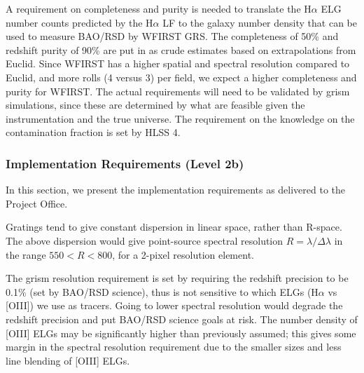 
 A requirement on completeness and purity is needed to translate the H$\alpha$ ELG
 number counts predicted by the H$\alpha$ LF to the galaxy number density that can be used to measure BAO/RSD by WFIRST GRS.  The completeness of 50\% and redshift
 purity of 90\% are put in as crude estimates based on extrapolations from
 Euclid.  Since WFIRST has a higher spatial and spectral resolution compared to
 Euclid, and more rolls (4 versus 3) per field, we expect a higher completeness
 and purity for WFIRST.  The actual requirements will need to be validated by
 grism simulations, since these are determined by what are feasible given the
 instrumentation and the true universe.  The requirement on the knowledge on the
 contamination fraction is set by HLSS 4.


 \subsubsection{Implementation Requirements (Level 2b)} In this section, we present the implementation requirements as delivered to the Project Office.


 Gratings tend to give constant dispersion in linear space, rather than R-space.
 The above dispersion would give point-source spectral resolution
 $R=\lambda/\Delta\lambda$ in the
 range $550 <R < 800$, for a 2-pixel resolution element.

 The grism resolution requirement is set by requiring the redshift precision to
 be 0.1\% (set by BAO/RSD science), thus is not sensitive to which ELGs (H$\alpha$
 vs [OIII]) we use as tracers. Going to lower spectral resolution would degrade
 the redshift precision and put BAO/RSD science goals at risk. The number density
 of [OIII] ELGs may be significantly higher than previously assumed; this gives
 some margin in the spectral resolution requirement due to the smaller sizes and
 less line blending of [OIII] ELGs.


